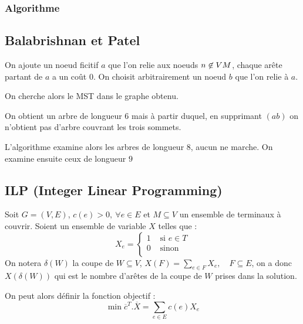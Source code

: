 \documentclass[a4paper,11pt]{thesis}
\begin{document}

\subsubsection{Algorithme}


\subsection{Balabrishnan et Patel}


On ajoute un noeud ficitif $a$ que l'on relie aux noeuds $n \not \in V \\ M$, chaque arête partant
de $a$ a un coût $0$. On choisit arbitrairement un noeud $b$ que l'on relie à $a$.

On cherche alors le MST dans le graphe obtenu.


On obtient un arbre de longueur $6$ mais à partir duquel, en supprimant $(ab)$ on n'obtient pas
d'arbre couvrant les trois sommets.


L'algorithme examine alors les arbres de longueur $8$, aucun ne marche. On examine ensuite ceux de
longueur $9$


\subsection{ILP (Integer Linear Programming)}

Soit $G = (V, E)$, $c(e) > 0,\ \forall e \in E$ et $M \subseteq V$ un ensemble de terminaux à
couvrir. Soient un ensemble de variable $X$ telles que : \begin{displaymath}
    X_e = \left \lbrace
    \begin{array}{rl}
        1 & \mbox{ si } e \in T \\
        0 & \mbox{ sinon } \\
    \end{array}
    \right .
\end{displaymath}
On notera $\delta(W)$ la coupe de $W \subseteq V$, $X(F) = \sum_{e \in F} X_e,\quad F \subseteq E$,
on a donc $X(\delta(W))$ qui est le nombre d'arêtes de la coupe de $W$ prises dans la solution.

On peut alors définir la fonction objectif : 
\begin{displaymath}
    \min \overline{c}^T . \overline{X} = \sum_{e \in E} c(e)X_e
\end{displaymath}
\end{document}
